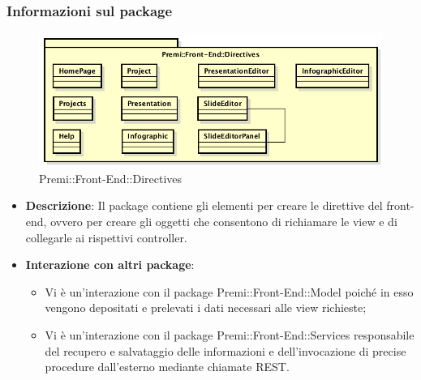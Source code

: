 \subsubsection{Informazioni sul package}
\begin{figure}[h]
	\centering
	\includegraphics[width=0.9\linewidth]{img/front-end_directives}
	\caption[Premi::Front-End::Directives]{Premi::Front-End::Directives}
\end{figure}
\begin{itemize}
	\item \textbf{Descrizione}: Il package contiene gli elementi per creare le direttive del \gls{front-end}, ovvero per creare gli oggetti che consentono di richiamare le view e di collegarle ai rispettivi controller.
	\item \textbf{Interazione con altri package}:
	\begin{itemize}
		\item Vi è un'interazione con il package Premi::Front-End::Model poiché in esso vengono depositati e prelevati i dati necessari alle view richieste;
		\item Vi è un'interazione con il package Premi::Front-End::Services responsabile del recupero e salvataggio delle informazioni e dell'invocazione di precise procedure dall'esterno mediante chiamate REST.
	\end{itemize}
\end{itemize}

